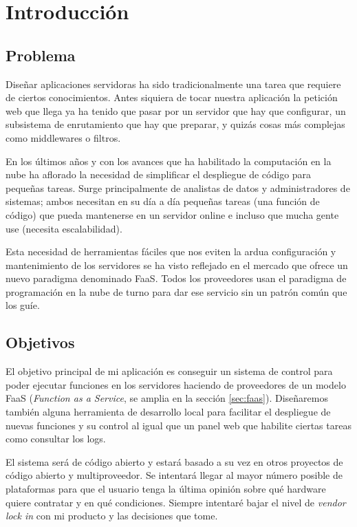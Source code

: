 \chapter{Introducción}
\label{chap:introduccion}

\section{Problema}

Diseñar aplicaciones servidoras ha sido tradicionalmente una tarea que requiere de ciertos conocimientos. Antes siquiera de tocar nuestra aplicación la petición web que llega ya ha tenido que pasar por un servidor que hay que configurar, un subsistema de enrutamiento que hay que preparar, y quizás cosas más complejas como middlewares o filtros.

En los últimos años y con los avances que ha habilitado la computación en la nube ha aflorado la necesidad de simplificar el despliegue de código para pequeñas tareas. Surge principalmente de analistas de datos y administradores de sistemas; ambos necesitan en su día a día pequeñas tareas (una función de código) que pueda mantenerse en un servidor online e incluso que mucha gente use (necesita escalabilidad).

Esta necesidad de herramientas fáciles que nos eviten la ardua configuración y mantenimiento de los servidores se ha visto reflejado en el mercado que ofrece un nuevo paradigma denominado FaaS. Todos los proveedores usan el paradigma de programación en la nube de turno para dar ese servicio sin un patrón común que los guíe.

\section{Objetivos}

El objetivo principal de mi aplicación es conseguir un sistema de control para poder ejecutar funciones en los servidores haciendo de proveedores de un modelo FaaS (\emph{Function as a Service}, se amplia en la sección \ref{sec:faas}). Diseñaremos también alguna herramienta de desarrollo local para facilitar el despliegue de nuevas funciones y su control al igual que un panel web que habilite ciertas tareas como consultar los logs.

El sistema será de código abierto y estará basado a su vez en otros proyectos de código abierto y multiproveedor. Se intentará llegar al mayor número posible de plataformas para que el usuario tenga la última opinión sobre qué hardware quiere contratar y en qué condiciones. Siempre intentaré bajar el nivel de \emph{vendor lock in} con mi producto y las decisiones que tome.

